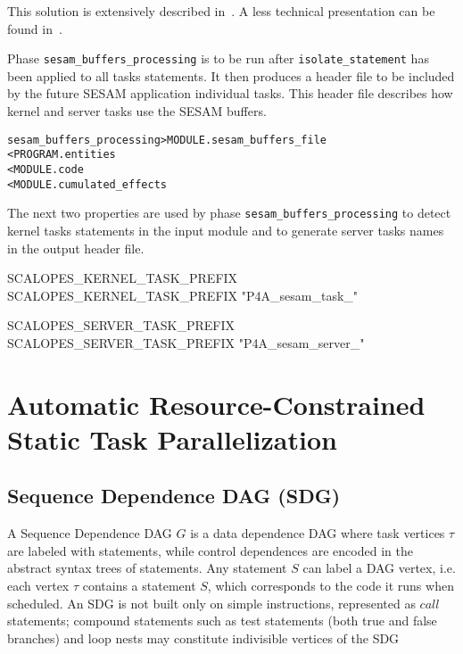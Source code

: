 \documentclass[a4paper]{report}
\newenvironment{PipsMake}{\begin{alltt}}{\end{alltt}}
\newenvironment{PipsPass}[1]{\label{pass:#1}}{}
\begin{document}
This solution is extensively described in~\cite{Creu11a}. A less
technical presentation can be found in~\cite{Ventroux2012}.

\begin{PipsPass}{sesam_buffers_processing}
Phase \texttt{sesam\_buffers\_processing} is to be run after
\texttt{isolate\_statement} has been applied to all tasks
statements. It then produces a header file to be included by the
future SESAM application individual tasks. This header file describes
how kernel and server tasks use the SESAM buffers.
\end{PipsPass}
\begin{PipsMake}
sesam_buffers_processing    > MODULE.sesam_buffers_file
              < PROGRAM.entities
              < MODULE.code
              < MODULE.cumulated_effects
\end{PipsMake}

The next two properties are used by phase
\texttt{sesam\_buffers\_processing} to detect kernel tasks statements
in the input module and to generate server tasks names in the output
header file.

\begin{PipsProp}{SCALOPES_KERNEL_TASK_PREFIX}
SCALOPES_KERNEL_TASK_PREFIX "P4A_sesam_task_"
\end{PipsProp}
\begin{PipsProp}{SCALOPES_SERVER_TASK_PREFIX}
SCALOPES_SERVER_TASK_PREFIX "P4A_sesam_server_"
\end{PipsProp}

\clearpage



\section{Automatic Resource-Constrained Static Task Parallelization}
\label{subsubsection-task-parallelization}



\subsection{Sequence Dependence DAG (SDG)}
A Sequence Dependence DAG $G$ is a data dependence DAG where task vertices $\tau$ are labeled with statements, while control dependences are encoded in the abstract syntax trees of statements. Any statement $S$ can label a DAG vertex, i.e. each vertex $\tau$  contains a statement $S$, which corresponds to the code it runs when scheduled.  An SDG is not built only on simple instructions, represented as $call$ statements; compound statements such as test statements (both true and false branches) and loop nests may constitute indivisible vertices of the SDG
\end{document}
